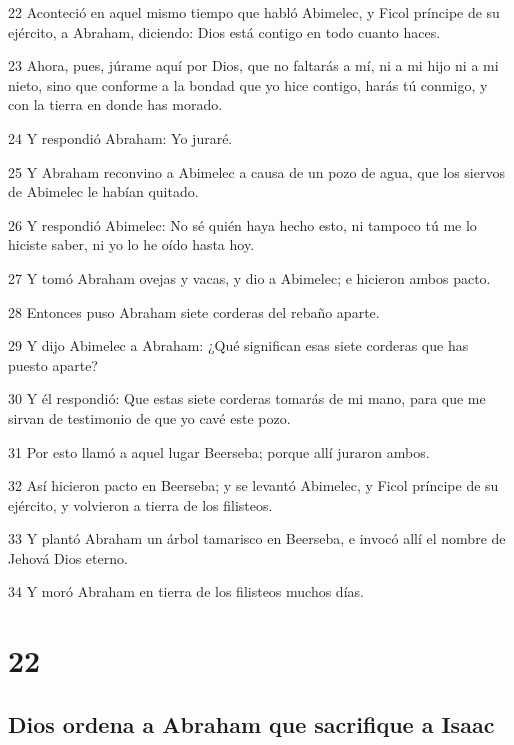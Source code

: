 \par 22 Aconteció en aquel mismo tiempo que habló Abimelec, y Ficol príncipe de su ejército, a Abraham, diciendo: Dios está contigo en todo cuanto haces.
\par 23 Ahora, pues, júrame aquí por Dios, que no faltarás a mí, ni a mi hijo ni a mi nieto, sino que conforme a la bondad que yo hice contigo, harás tú conmigo, y con la tierra en donde has morado.
\par 24 Y respondió Abraham: Yo juraré.
\par 25 Y Abraham reconvino a Abimelec a causa de un pozo de agua, que los siervos de Abimelec le habían quitado.
\par 26 Y respondió Abimelec: No sé quién haya hecho esto, ni tampoco tú me lo hiciste saber, ni yo lo he oído hasta hoy.
\par 27 Y tomó Abraham ovejas y vacas, y dio a Abimelec; e hicieron ambos pacto.
\par 28 Entonces puso Abraham siete corderas del rebaño aparte.
\par 29 Y dijo Abimelec a Abraham: ¿Qué significan esas siete corderas que has puesto aparte?
\par 30 Y él respondió: Que estas siete corderas tomarás de mi mano, para que me sirvan de testimonio de que yo cavé este pozo.
\par 31 Por esto llamó a aquel lugar Beerseba; porque allí juraron ambos.
\par 32 Así hicieron pacto en Beerseba; y se levantó Abimelec, y Ficol príncipe de su ejército, y volvieron a tierra de los filisteos.
\par 33 Y plantó Abraham un árbol tamarisco en Beerseba, e invocó allí el nombre de Jehová Dios eterno.
\par 34 Y moró Abraham en tierra de los filisteos muchos días.

\chapter{22}

\section*{Dios ordena a Abraham que sacrifique a Isaac}

